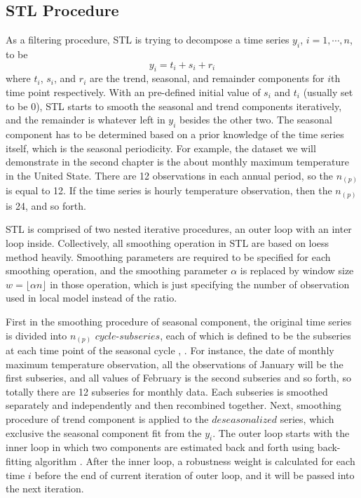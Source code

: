 \subsection{STL Procedure}

As a filtering procedure, STL is trying to decompose a time series 
$y_i$, $i=1, \cdots, n$, to be
\begin{equation} 
\label{stlModel}
y_i = t_i + s_i + r_i
\end{equation}
where $t_i$, $s_i$, and $r_i$ are the trend, seasonal, and remainder components
for $i$th time point respectively. With an pre-defined initial value of $s_i$ and 
$t_i$ (usually set to be 0), STL starts to smooth the seasonal and trend components iteratively, and the remainder is whatever left in $y_i$ besides the other two. 
The seasonal component has to be determined based on a prior knowledge of the time
series itself, which is the seasonal periodicity. For example, the dataset we will
demonstrate in the second chapter is the about monthly maximum temperature in the
United State. There are 12 observations in each annual period, so the $n_{(p)}$ 
is equal to 12. If the time series is hourly temperature observation, then the
$n_{(p)}$ is 24, and so forth.

STL is comprised of two nested iterative procedures, an outer loop with an inter 
loop inside. Collectively, all smoothing operation in STL are based on loess method
heavily. Smoothing parameters are required to be specified for each smoothing 
operation, and the smoothing parameter $\alpha$ is replaced by window size
$w=\lfloor \alpha n\rfloor$ in those operation, which is just specifying the 
number of observation used in local model instead of the ratio.  

First in the smoothing procedure of seasonal component, the original time series 
is divided into $n_{(p)}$ $cycle$-$subseries$, each of which is defined to be 
the subseries at each time point of the seasonal cycle \cite{hafen2010local}, 
\cite{Cleveland:1990}. For instance, the date of monthly maximum temperature 
observation, all the observations of January will be the first subseries, and
all values of February is the second subseries and so forth, so totally there are 
12 subseries for monthly data. Each subseries is smoothed separately and 
independently and then recombined together. Next, smoothing procedure of 
trend component is applied to the $deseasonalized$ series, which exclusive the 
seasonal component fit from the $y_i$. The outer loop starts with the inner loop
in which two components are estimated back and forth using back-fitting algorithm 
\cite{breiman1985estimating}. After the inner loop, a robustness weight is 
calculated for each time $i$ before the end of current iteration of outer loop,
and it will be passed into the next iteration.

